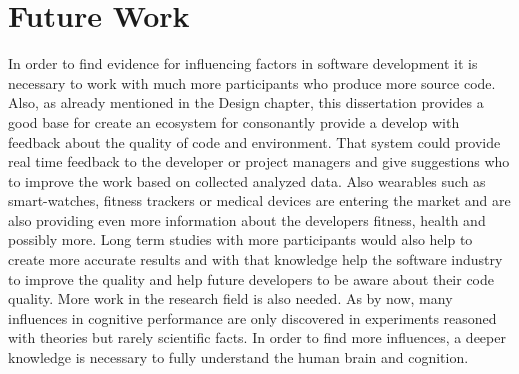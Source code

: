 \section{Future Work}
In order to find evidence for influencing factors in software development it is necessary to work with much more participants who produce more source code.
\bigbreak
Also, as already mentioned in the Design chapter, this dissertation provides a good base for create an ecosystem for consonantly provide a develop with feedback about the quality of code and environment. That system could provide real time feedback to the developer or project managers and give suggestions who to improve the work based on collected analyzed data. 
Also wearables such as smart-watches, fitness trackers or medical devices are entering the market and are also providing even more information about the developers fitness, health and possibly more. 
Long term studies with more participants would also help to create more accurate results and with that knowledge help the software industry to improve the quality and help future developers to be aware about their code quality. 
More work in the research field is also needed. As by now, many influences in cognitive performance are only discovered in experiments reasoned with theories but rarely scientific facts. In order to find more influences, a deeper knowledge is necessary to fully understand the human brain and cognition. 

